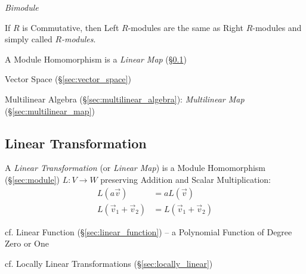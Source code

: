 \emph{Bimodule}

If $R$ is Commutative, then Left $R$-modules are the same as Right
$R$-modules and simply called \emph{$R$-modules}.

A Module Homomorphism is a \emph{Linear Map} (\S\ref{sec:linear_transformation})

Vector Space (\S\ref{sec:vector_space})

Multilinear Algebra (\S\ref{sec:multilinear_algebra}):
\emph{Multilinear Map} (\S\ref{sec:multilinear_map})



\subsection{Linear Transformation}\label{sec:linear_transformation}

A \emph{Linear Transformation} (or \emph{Linear Map}) is a Module Homomorphism
(\S\ref{sec:module}) $L : V \rightarrow W$ preserving Addition and Scalar
Multiplication:
\begin{align*}
  L(a\vec{v})              & = aL(\vec{v}) \\
  L(\vec{v}_1 + \vec{v}_2) & = L(\vec{v}_1 + \vec{v}_2)
\end{align*}

\fist cf. Linear Function (\S\ref{sec:linear_function}) -- a Polynomial
Function of Degree Zero or One

\fist cf. Locally Linear Transformations (\S\ref{sec:locally_linear})

